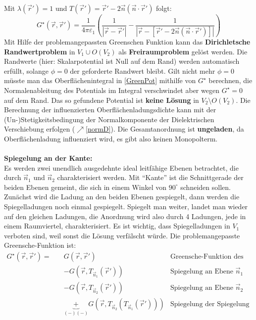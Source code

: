 		  	 Mit $\lambda(\vec{r}' ) = 1$ und $T(\vec{r}' ) = \vec{r}'  - 2  \vec{n}  (\vec{n}\cdot \vec{r}' )$ folgt:
		  	\begin{equation}
		  		G^\star(\vec{r} ,\vec{r}' ) = \frac{1}{4\pi\varepsilon_1}  \left(  \frac{1}{\left|\vec{r}  -  \vec{r}'  \right|}  - \frac{1}{\left|\vec{r}  -  \left[ \vec{r}'  - 2 \vec{n} (\vec{n}\cdot \vec{r}' ) \right] \right|}\right)
		  	\end{equation}
		  	 Mit Hilfe der problemangepassten Greenschen Funktion kann das \textbf{Dirichletsche Randwertproblem} in $V_1 \cup O(V_2)$ als \textbf{Freiraumproblem} gelöst werden. Die Randwerte (hier: Skalarpotential ist Null auf dem Rand) werden automatisch erfüllt, solange $\phi=0$ der geforderte Randwert bleibt. Gilt nicht mehr $\phi=0$ müsste man das Oberflächenintegral in \ref{GreenPot} mithilfe von $G^\star$ berechnen, die Normalenableitung des Potentials im Integral verschwindet aber wegen $G^\star=0$ auf dem Rand. Das so gefundene Potential ist \textbf{keine Lösung} in $V_2 \setminus O(V_2)$. Die Berechnung der influenzierten Oberflächenladungsdichte kann mit der (Un-)Stetigkeitsbedingung der Normalkomponente der Dielektrischen Verschiebung erfolgen ($\nearrow$\ref{normD}). Die Gesamtanordnung ist \textbf{ungeladen}, da Oberflächenladung influenziert wird, es gibt also keinen Monopolterm.\\\\
		  \textbf{Spiegelung an der Kante:}\\
		  	 Es werden zwei unendlich ausgedehnte ideal leitfähige Ebenen betrachtet, die durch $\vec{n}_1$ und $\vec{n}_2$ charakterisiert werden. Mit \enquote{Kante} ist die Schnittgerade der beiden Ebenen gemeint, die sich in einem Winkel von $90^\circ$ schneiden sollen. Zunächst wird die Ladung an den beiden Ebenen gespiegelt, dann werden die Spiegelladungen noch einmal gespiegelt. Spiegelt man weiter, landet man wieder auf den gleichen Ladungen, die Anordnung wird also durch 4 Ladungen, jede in einem Raumviertel, charakterisiert. Es ist wichtig, dass Spiegelladungen in $V_1$ verboten sind, weil sonst die Lösung verfälscht würde. Die problemangepasste Greensche-Funktion ist:
		  \begin{align}
		  	G^\star(\vec{r} , \vec{r}' )  =\quad & G (\vec{r} , \vec{r}' )                                                         & \text{Greensche-Funktion des Freiraums} \\
		  	& - G (\vec{r} , T_{\vec{n}_1}(\vec{r}' ))                                        & \text{Spiegelung an Ebene } \vec{n}_1   \nonumber\\
		  	& - G (\vec{r} , T_{\vec{n}_2}(\vec{r}' ))                                        & \text{Spiegelung an Ebene } \vec{n}_2   \nonumber\\
		  	& \underbrace{+}_{(-)( -)}  G (\vec{r} , T_{\vec{n}_2}(T_{\vec{n}_1}(\vec{r}' ))) & \text{Spiegelung der Spiegelung}\nonumber
		  \end{align}

